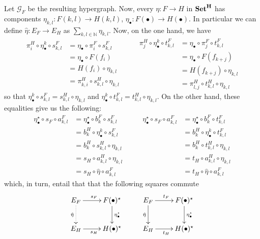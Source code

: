 \documentclass[runningheads,envcountsect]{llncs}
\newcommand{\catname}[1]{\textbf{\textup{#1}}}
\begin{document}
Let $\mathcal{G}_F$ be the resulting hypergraph. Now, every $\eta\colon F\rightarrow H$ in $\catname{Set}^{\catname{H}}$ has components $\eta_{k,l}\colon F(k,l)\to H(k,l)$, $\eta_{\bullet}\colon F(\bullet)\to H(\bullet)$. In particular we can define $\hat{\eta}\colon E_F\rightarrow E_H$ as $\sum_{k,l\in \mathbb{N}}\eta_{k,l}$. Now, on the one hand, we have
\[\begin{split}
	\pi^H_i\circ \eta^k_\bullet \circ  s^F_{k,l}&=\eta_\bullet \circ \pi^F_i \circ s^F_{k,l}\\&=\eta_\bullet \circ F(f_i)\\&=H(f_i)\circ \eta_{k,l}\\&=\pi^H_{k,i}\circ s^{H}_{k,l}\circ \eta_{k,l}
\end{split} \qquad \begin{split}
\pi^H_j\circ \eta^k_\bullet \circ  t^F_{k,l}&=\eta_\bullet \circ \pi^F_j \circ t^F_{k,l}\\&=\eta_\bullet \circ F(f_{k+j})\\&=H(f_{k+j})\circ \eta_{k,l}\\&=\pi^H_{l,j}\circ t^{H}_{k,l}\circ \eta_{k,l}
\end{split} \]
so that $\eta^k_\bullet \circ  s^F_{k,l}=s^{H}_{k,l}\circ \eta_{k,l}$ and $\eta^k_\bullet \circ  t^F_{k,l}= t^{H}_{k,l}\circ \eta_{k,l}$. On the other hand, these equalities give us the following:
\[\begin{split}
	\eta_{\bullet}^\star \circ s_{F}\circ a^F_{k,l}&=\eta_{\bullet}^\star \circ b^F_k\circ s^F_{k,l}\\&=b^H_k\circ \eta^k_{\bullet}\circ s^{F}_{k,l} \\&=b^H_{k}\circ s^H_{k,l}\circ \eta_{k,l}\\&=s_H\circ a^H_{k,l}\circ \eta_{k,l}\\&=	s_H\circ \hat{\eta}\circ a^F_{k,l}
\end{split} \qquad \begin{split}
	\eta_{\bullet}^\star \circ s_{F}\circ a^F_{k,l}&=\eta_{\bullet}^\star \circ b^F_k\circ t^F_{k,l}\\&=b^H_k\circ \eta^k_{\bullet}\circ t^{F}_{k,l} \\&=b^H_{k}\circ t^H_{k,l}\circ \eta_{k,l}\\&=t_H\circ a^H_{k,l}\circ \eta_{k,l}\\&=	t_H\circ \hat{\eta}\circ a^F_{k,l}
\end{split}\]
which, in turn, entail that  that the following squares commute
\[\xymatrix{E_F \ar[r]^{s_F} \ar@{.>}[d]_{\hat{\eta}}& F(\bullet)^\star \ar[d]^{\eta^\star_\bullet} & E_F \ar[r]^{t_F} \ar[d]_{\hat{\eta}} & F(\bullet)^\star \ar[d]^{\eta^\star_\bullet}\\ E_H \ar[r]_{s_H} & H(\bullet)^\star & E_H \ar[r]_{t_H}& H(\bullet)^\star}\]
\end{document}
